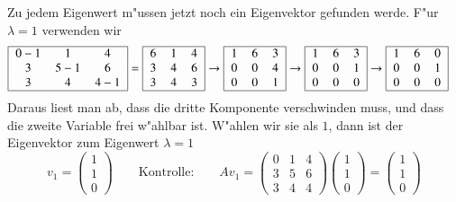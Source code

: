 Zu jedem Eigenwert m"ussen jetzt noch ein Eigenvektor gefunden werde.
F"ur $\lambda=1$ verwenden wir 
\begin{align*}
\begin{tabular}{|>{$}c<{$}>{$}c<{$}>{$}c<{$}|}
\hline
0-1&1&4\\
3&5-1&6\\
3&4&4-1\\
\hline
\end{tabular}
&=
\begin{tabular}{|>{$}c<{$}>{$}c<{$}>{$}c<{$}|}
\hline
6&1&4\\
3&4&6\\
3&4&3\\
\hline
\end{tabular}
\rightarrow
\begin{tabular}{|>{$}c<{$}>{$}c<{$}>{$}c<{$}|}
\hline
1&6&3\\
0&0&4\\
0&0&1\\
\hline
\end{tabular}
\rightarrow
\begin{tabular}{|>{$}c<{$}>{$}c<{$}>{$}c<{$}|}
\hline
1&6&3\\
0&0&1\\
0&0&0\\
\hline
\end{tabular}
\rightarrow
\begin{tabular}{|>{$}c<{$}>{$}c<{$}>{$}c<{$}|}
\hline
1&6&0\\
0&0&1\\
0&0&0\\
\hline
\end{tabular}
\end{align*}
Daraus liest man ab, dass die dritte Komponente verschwinden muss, und dass
die zweite Variable frei w"ahlbar ist.
W"ahlen wir sie als $1$, dann ist der Eigenvektor zum Eigenwert $\lambda=1$
\[
v_1
=
\begin{pmatrix}1\\1\\0\end{pmatrix}
\qquad\text{Kontrolle:}\qquad
Av_1
=
\begin{pmatrix}
0&1&4\\
3&5&6\\
3&4&4
\end{pmatrix}
\begin{pmatrix}1\\1\\0\end{pmatrix}
=
\begin{pmatrix}1\\1\\0\end{pmatrix}
\]

